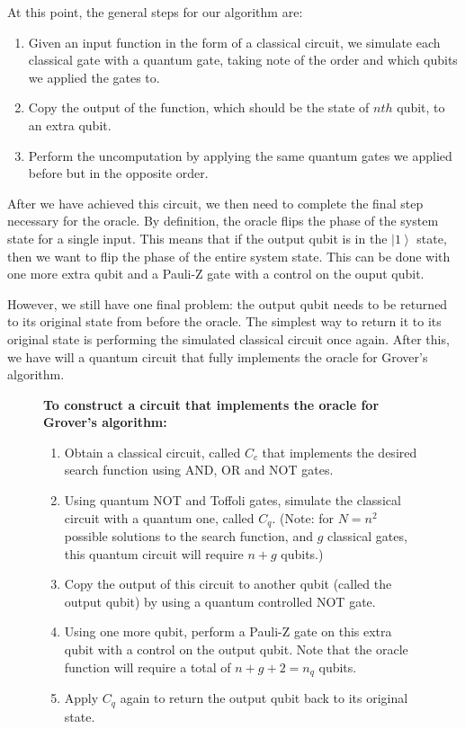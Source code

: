 \documentclass[11pt]{article}
\begin{document}
At this point, the general steps for our algorithm are:

\begin{enumerate}
	\item Given an input function in the form of a classical circuit, we simulate each classical gate with a quantum gate, taking note of the order and which qubits we applied the gates to.
	\item Copy the output of the function, which should be the state of $nth$ qubit, to an extra qubit.
	\item Perform the uncomputation by applying the same quantum gates we applied before but in the opposite order. 
\end{enumerate}

After we have achieved this circuit, we then need to complete the final step necessary for the oracle. By definition, the oracle flips the phase of the system state for a single input. This means that if the output qubit is in the $\left | 1 \right \rangle$ state, then we want to flip the phase of the entire system state. This can be done with one more extra qubit and a Pauli-Z gate with a control on the ouput qubit.

However, we still have one final problem: the output qubit needs to be returned to its original state from before the oracle. The simplest way to return it to its original state is performing the simulated classical circuit once again. After this, we have will a quantum circuit that fully implements the oracle for Grover's algorithm.

\begin{figure}[H]
\begin{framed}
\textbf{To construct a circuit that implements the oracle for Grover's algorithm:}
\begin{enumerate}
\item Obtain a classical circuit, called $C_{c}$ that implements the desired search function using AND, OR and NOT gates.
\item Using quantum NOT and Toffoli gates, simulate the classical circuit with a quantum one, called $C_{q}$. (Note: for $N=n^{2}$ possible solutions to the search function, and $g$ classical gates, this quantum circuit will require $n+g$ qubits.)
\item Copy the output of this circuit to another qubit (called the output qubit) by using a quantum controlled NOT gate.
\item Using one more qubit, perform a Pauli-Z gate on this extra qubit with a control on the output qubit. Note that the oracle function will require a total of $n+g+2=n_{q}$ qubits.
\item Apply $C_{q}$ again to return the output qubit back to its original state.
\end{enumerate}
\end{framed}
\end{figure}
\end{document}
